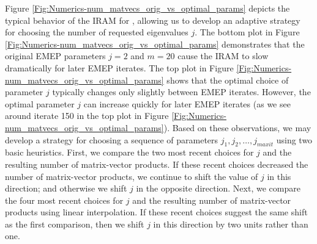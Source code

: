 Figure \ref{Fig:Numerics-num_matvecs_orig_vs_optimal_params} depicts the typical behavior of the IRAM for \emeps, allowing us to develop an adaptive strategy for choosing the number of requested eigenvalues $j$.
The bottom plot in Figure \ref{Fig:Numerics-num_matvecs_orig_vs_optimal_params} demonstrates that the original EMEP parameters $j=2$ and $m=20$ cause the IRAM to slow dramatically for later EMEP iterates.
The top plot in Figure \ref{Fig:Numerics-num_matvecs_orig_vs_optimal_params} shows that the optimal choice of parameter $j$ typically changes only slightly between EMEP iterates.
However, the optimal parameter $j$ can increase quickly for later EMEP iterates (as we see around iterate 150 in the top plot in Figure \ref{Fig:Numerics-num_matvecs_orig_vs_optimal_params}).
Based on these observations, we may develop a strategy for choosing a sequence of parameters $j_1, j_2, \ldots, j_{maxit}$ using two basic heuristics.
First, we compare the two most recent choices for $j$ and the resulting number of matrix-vector products.
If these recent choices decreased the number of matrix-vector products, we continue to shift the value of $j$ in this direction; and otherwise we shift $j$ in the opposite direction.
Next, we compare the four most recent choices for $j$ and the resulting number of matrix-vector products using linear interpolation.
If these recent choices suggest the same shift as the first comparison, then we shift $j$ in this direction by two units rather than one.







